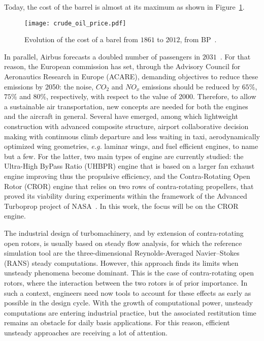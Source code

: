 Today, the cost of the barrel is almost at its maximum as shown
in Figure~\ref{fig:crude_oil_price}.
\begin{figure}[htp]
  \centering
  \texttt{[image: crude\_oil\_price.pdf]}
  \caption{Evolution of the cost of a barel from $1861$ to $2012$, from BP~\cite{bpreview2013}.}
  \label{fig:crude_oil_price}
\end{figure}
In parallel, Airbus forecasts a doubled number of passengers in
$2031$~\cite{AirbusForecast2013}. For that reason, the European commission has set, through the
Advisory Council for Aeronautics Research in Europe (ACARE),
demanding objectives to reduce these emissions by 2050:
the noise, $CO_2$ and $NO_x$ emissions should be reduced by 
$65\%$, $75\%$ and $80\%$, respectively, with respect to
the value of 2000.
Therefore, to allow a sustainable air transportation, new
concepts are needed for both the engines and the 
aircraft in general.
Several have emerged, among which lightweight construction
with advanced composite structure, airport collaborative decision
making with continuous climb departure and less waiting in taxi,
aerodynamically optimized wing geometries, \emph{e.g.} laminar wings,
and fuel efficient engines, to name but a few.
For the latter, two main types of engine are currently studied: the
Ultra-High ByPass Ratio (UHBPR) engine that is based on a
larger fan exhaust engine improving thus the
propulsive efficiency, and the Contra-Rotating Open Rotor (CROR)
engine that relies on two rows of contra-rotating propellers,
that proved its viability during experiments within the framework of
the Advanced Turboprop project of NASA~\cite{Hager1988}.
In this work, the focus will be on the CROR engine.
\newline 

The industrial design of turbomachinery, and by extension of contra-rotating
open rotors, is usually based on steady flow analysis, 
for which the reference simulation tool are the three-dimensio\-nal Reynolds-Averaged 
Navier--Stokes (RANS) steady computations. However, this approach finds its limits 
when unsteady phenomena become dominant. This is the case of 
contra-rotating open rotors, where the interaction between the
two rotors is of prior importance. 
In such a
context, engineers need now tools to account for these effects as
early as possible in the design cycle. With the growth of
computational power, unsteady computations are entering industrial
practice, but the associated restitution time remains an obstacle for
daily basis applications.  For this reason, efficient
unsteady approaches are receiving a lot of attention. 


